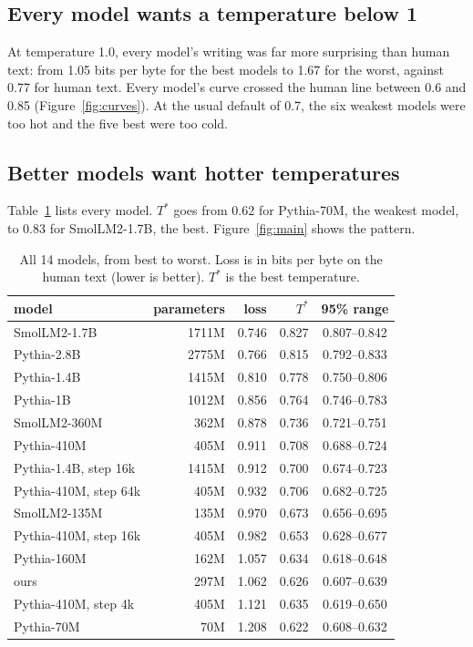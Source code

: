\documentclass[10pt]{article}
\begin{document}
\subsection{Every model wants a temperature below 1}

At temperature 1.0, every model's writing was far more surprising than human text: from 1.05 bits per byte for the best models to 1.67 for the worst, against 0.77 for human text. Every model's curve crossed the human line between 0.6 and 0.85 (Figure~\ref{fig:curves}). At the usual default of 0.7, the six weakest models were too hot and the five best were too cold.

\subsection{Better models want hotter temperatures}

Table~\ref{tab:models} lists every model. $T^*$ goes from 0.62 for Pythia-70M, the weakest model, to 0.83 for SmolLM2-1.7B, the best. Figure~\ref{fig:main} shows the pattern.

\begin{table}[t]
\centering
\small
\begin{tabular}{lrrrc}
\toprule
model & parameters & loss & $T^*$ & 95\% range \\
\midrule
SmolLM2-1.7B & 1711M & 0.746 & 0.827 & 0.807--0.842 \\
Pythia-2.8B & 2775M & 0.766 & 0.815 & 0.792--0.833 \\
Pythia-1.4B & 1415M & 0.810 & 0.778 & 0.750--0.806 \\
Pythia-1B & 1012M & 0.856 & 0.764 & 0.746--0.783 \\
SmolLM2-360M & 362M & 0.878 & 0.736 & 0.721--0.751 \\
Pythia-410M & 405M & 0.911 & 0.708 & 0.688--0.724 \\
Pythia-1.4B, step 16k & 1415M & 0.912 & 0.700 & 0.674--0.723 \\
Pythia-410M, step 64k & 405M & 0.932 & 0.706 & 0.682--0.725 \\
SmolLM2-135M & 135M & 0.970 & 0.673 & 0.656--0.695 \\
Pythia-410M, step 16k & 405M & 0.982 & 0.653 & 0.628--0.677 \\
Pythia-160M & 162M & 1.057 & 0.634 & 0.618--0.648 \\
ours & 297M & 1.062 & 0.626 & 0.607--0.639 \\
Pythia-410M, step 4k & 405M & 1.121 & 0.635 & 0.619--0.650 \\
Pythia-70M & 70M & 1.208 & 0.622 & 0.608--0.632 \\
\bottomrule
\end{tabular}
\caption{All 14 models, from best to worst. Loss is in bits per byte on the human text (lower is better). $T^*$ is the best temperature.}
\label{tab:models}
\end{table}
\end{document}

